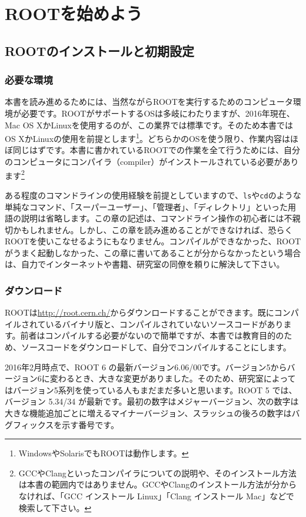 \chapter{ROOTを始めよう}
\label{chapter_Install}
\section{ROOTのインストールと初期設定}
\label{sec_ROOT_install}
\subsection{必要な環境}
本書を読み進めるためには、当然ながらROOTを実行するためのコンピュータ環境が必要です。ROOTがサポートするOSは多岐にわたりますが、2016年現在、Mac OS XかLinuxを使用するのが、この業界では標準です。そのため本書ではOS XかLinuxの使用を前提とします\footnote{WindowsやSolarisでもROOTは動作します。}。どちらかのOSを使う限り、作業内容はほぼ同じはずです。本書に書かれているROOTでの作業を全て行うためには、自分のコンピュータにコンパイラ（compiler）がインストールされている必要があります\footnote{GCCやClangといったコンパイラについての説明や、そのインストール方法は本書の範囲内ではありません。GCCやClangのインストール方法が分からなければ、「GCC インストール Linux」「Clang インストール Mac」などで検索して下さい。}

ある程度のコマンドラインの使用経験を前提としていますので、\texttt{ls}や\texttt{cd}のような単純なコマンド、「スーパーユーザー」、「管理者」、「ディレクトリ」といった用語の説明は省略します。この章の記述は、コマンドライン操作の初心者には不親切かもしれません。しかし、この章を読み進めることができなければ、恐らくROOTを使いこなせるようにもなりません。コンパイルができなかった、ROOTがうまく起動しなかった、この章に書いてあることが分からなかったという場合は、自力でインターネットや書籍、研究室の同僚を頼りに解決して下さい。

\subsection{ダウンロード}
\label{subsec_download}
ROOTは\url{http://root.cern.ch/}からダウンロードすることができます。既にコンパイルされているバイナリ版と、コンパイルされていないソースコードがあります。前者はコンパイルする必要がないので簡単ですが、本書では教育目的のため、ソースコードをダウンロードして、自分でコンパイルすることにします。

2016年2月時点で、ROOT 6 の最新バージョン6.06/00です。バージョン5からバージョン6に変わるとき、大きな変更がありました。そのため、研究室によってはバージョン5系列を使っている人もまだまだ多いと思います。ROOT 5 では、バージョン 5.34/34 が最新です。最初の数字はメジャーバージョン、次の数字は大きな機能追加ごとに増えるマイナーバージョン、スラッシュの後ろの数字はバグフィックスを示す番号です。

